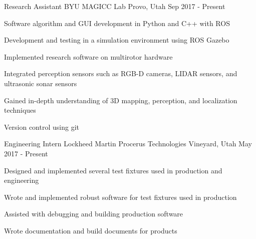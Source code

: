 
\begin{cventries}


\cventry
  {Research Assistant} %
  {BYU MAGICC Lab} %
  {Provo, Utah} %
  {Sep 2017 - Present} %
  {
    \begin{cvitems} %
      \item{Software algorithm and GUI development in Python and C++ with ROS}
      \item{Development and testing in a simulation environment using ROS Gazebo}
      \item{Implemented research software on multirotor hardware}
      \item{Integrated perception sensors such as RGB-D cameras, LIDAR sensors, and ultrasonic sonar sensors}
      \item{Gained in-depth understanding of 3D mapping, perception, and localization techniques}
      \item{Version control using git}
    \end{cvitems}
  }


  \cventry
    {Engineering Intern} %
    {Lockheed Martin Procerus Technologies} %
    {Vineyard, Utah} %
    {May 2017 - Present} %
    {
    \begin{cvitems}
      \item{Designed and implemented several test fixtures used in production and engineering}
      \item{Wrote and implemented robust software for test fixtures used in production}
      \item{Assisted with debugging and building production software}
      \item{Wrote documentation and build documents for products}
    \end{cvitems}
    }


\end{cventries}
